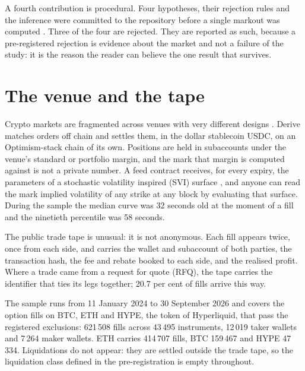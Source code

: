 \documentclass[a4paper,fleqn]{cas-dc}
\begin{document}
A fourth contribution is procedural. Four hypotheses, their rejection rules and the inference were committed
to the repository before a single markout was computed \citep{burlig2018}. Three of the four are rejected.
They are reported as such, because a pre-registered rejection is evidence about the market and not a failure
of the study: it is the reason the reader can believe the one result that survives.

\section{The venue and the tape}\label{sec:venue}
Crypto markets are fragmented across venues with very different designs \citep{makarov2020}. Derive matches
orders off chain and settles them, in the dollar stablecoin USDC, on an Optimism-stack chain of its own. Positions are held
in subaccounts under the venue's standard or portfolio margin, and the mark that margin is computed against is not a
private number. A feed contract receives, for every expiry, the parameters of a stochastic volatility
inspired (SVI) surface \citep{gatheral2014}, and anyone can read the mark implied volatility of any strike at any
block by evaluating that surface. During the sample the median curve was 32 seconds old at the moment of a
fill and the ninetieth percentile was 58 seconds.

The public trade tape is unusual: it is not anonymous. Each fill appears twice, once from each side,
and carries the wallet and subaccount of both parties, the transaction hash, the fee and rebate booked to
each side, and the realised profit. Where a trade came from a request for quote (RFQ), the tape carries the
identifier that ties its legs together; 20.7 per cent of fills arrive this way.

The sample runs from 11 January 2024 to 30 September 2026 and covers the option fills on BTC, ETH and HYPE,
the token of Hyperliquid, that pass the registered exclusions: 621\,508 fills across 43\,495 instruments, 12\,019 taker wallets and 7\,264 maker wallets. ETH carries
414\,707 fills, BTC 159\,467 and HYPE 47\,334. Liquidations do not appear: they are settled outside the
trade tape, so the liquidation class defined in the pre-registration is empty throughout.
\end{document}
